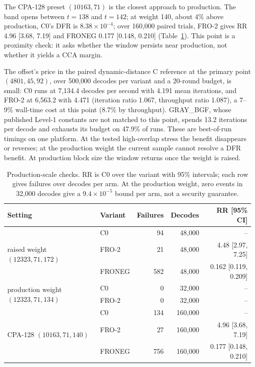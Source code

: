 The CPA-128 preset $(10163,71)$ is the closest approach to production. The band opens between $t=138$ and $t=142$; at weight 140, about 4\% above production, C0's DFR is $8.38\times10^{-4}$; over 160{,}000 paired trials, FRO-2 gives RR 4.96 [3.68, 7.19] and FRONEG 0.177 [0.148, 0.210] (Table~\ref{tab:added}). This point is a proximity check: it asks whether the window persists near production, not whether it yields a CCA margin.

The offset's price in the paired dynamic-distance C reference at the primary point $(4801,45,92)$, over 500{,}000 decodes per variant and a 20-round budget, is small: C0 runs at 7{,}134.4 decodes per second with 4.191 mean iterations, and FRO-2 at 6{,}563.2 with 4.471 (iteration ratio 1.067, throughput ratio 1.087), a 7--9\% wall-time cost at this point (8.7\% by throughput). GRAY\_BGF, whose published Level-1 constants are not matched to this point, spends 13.2 iterations per decode and exhausts its budget on 47.9\% of runs. These are best-of-run timings on one platform. At the tested high-overlap stress the benefit disappears or reverses; at the production weight the current sample cannot resolve a DFR benefit. At production block size the window returns once the weight is raised.

\begin{table}[!t]
\centering
\small
\caption{Production-scale checks. RR is C0 over the variant with 95\% intervals; each row gives failures over decodes per arm. At the production weight, zero events in 32{,}000 decodes give a $9.4\times10^{-5}$ bound per arm, not a security guarantee.}
\label{tab:added}
\begin{tabular}{llrrr}
\toprule
Setting & Variant & Failures & Decodes & RR [95\% CI] \\
\midrule
\multirow{3}{*}{raised weight $(12323,71,172)$} & C0 & 94 & 48{,}000 & -- \\
 & FRO-2 & 21 & 48{,}000 & 4.48 [2.97, 7.25] \\
 & FRONEG & 582 & 48{,}000 & 0.162 [0.119, 0.209] \\
\midrule
\multirow{2}{*}{production weight $(12323,71,134)$} & C0 & 0 & 32{,}000 & -- \\
 & FRO-2 & 0 & 32{,}000 & -- \\
\midrule
\multirow{3}{*}{CPA-128 $(10163,71,140)$} & C0 & 134 & 160{,}000 & -- \\
 & FRO-2 & 27 & 160{,}000 & 4.96 [3.68, 7.19] \\
 & FRONEG & 756 & 160{,}000 & 0.177 [0.148, 0.210] \\
\bottomrule
\end{tabular}
\end{table}


